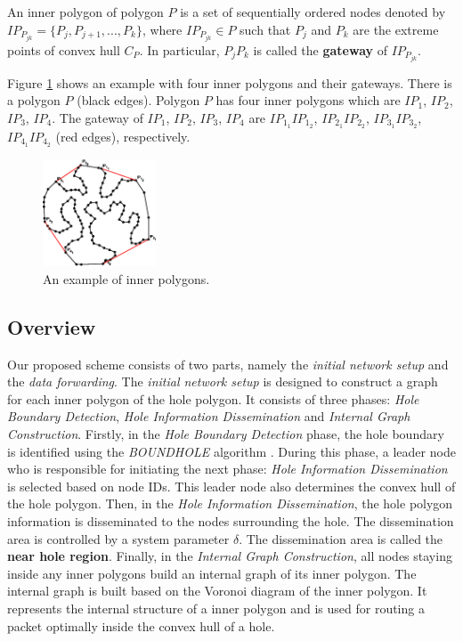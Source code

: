 \begin{mydef}
An inner polygon of polygon $P$ is a set of sequentially ordered nodes denoted by $IP_{P_{jk}} = \{ P_j, P_{j+1}, ..., P_k\}$, where $IP_{P_{jk}} \in P$ such that $P_j$ and $P_k$ are the extreme points of convex hull $C_P$. In particular, $P_jP_k$ is called the \textbf{gateway} of $IP_{P_{jk}}$.
\end{mydef}
Figure \ref{fig-def-inner} shows an example with four inner polygons and their gateways. There is a polygon $P$ (black edges). Polygon $P$ has four inner polygons which are $IP_1$, $IP_2$, $IP_3$, $IP_4$. The gateway of $IP_1$, $IP_2$, $IP_3$, $IP_4$ are $IP_{1_1}IP_{1_2}$, $IP_{2_1}IP_{2_2}$, $IP_{3_1}IP_{3_2}$, $IP_{4_1}IP_{4_2}$ (red edges), respectively.

\begin{figure}[!htb]
\centering
\includegraphics[width=0.3\textwidth]{Chapter4/Chapter4Figs/fig-innerpolygon.eps}
\caption{An example of inner polygons.}
\label{fig-def-inner}
\end{figure}

\subsection{Overview}
Our proposed scheme consists of two parts, namely the \emph{initial network setup} and the \emph{data forwarding}. The \emph{initial network setup} is designed to construct a graph for each inner polygon of the hole polygon. It consists of three phases: \emph{Hole Boundary Detection}, \emph{Hole Information Dissemination} and \emph{Internal Graph Construction}. Firstly, in the \emph{Hole Boundary Detection} phase, the hole boundary is identified using the \emph{BOUNDHOLE} algorithm \cite{boundhole}. During this phase, a leader node who is responsible for initiating the next phase: \emph{Hole Information Dissemination} is selected based on node IDs. This leader node also determines the convex hull of the hole polygon. Then, in the \emph{Hole Information Dissemination}, the hole polygon information is disseminated to the nodes surrounding the hole. The dissemination area is controlled by a system parameter $\delta$. The dissemination area is called the \textbf{near hole region}. Finally, in the \emph{Internal Graph Construction}, all nodes staying inside any inner polygons build an internal graph of its inner polygon. The internal graph is built based on the Voronoi diagram \cite{voronoi} of the inner polygon. It represents the internal structure of a inner polygon and is used for routing a packet optimally inside the convex hull of a hole.

